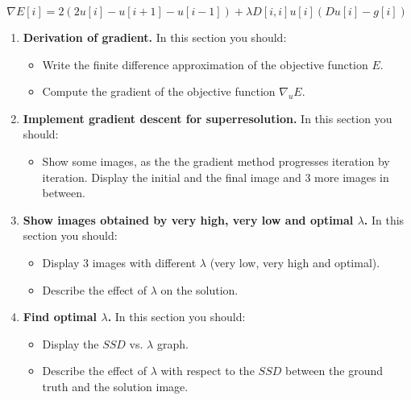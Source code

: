 \documentclass{paper}
\begin{document}
\begin{equation}
\nabla E[i] = 2 (2u[i] - u[i + 1] - u[i - 1]) + \lambda D[i,i] u[i] (Du[i] - g[i])
\end{equation}
\begin{enumerate}
\item \textbf{Derivation of gradient.} In this section you should:

\begin{itemize}
\item Write the finite difference approximation of the objective function $E$.
\item Compute the gradient of the objective function $\nabla_uE$.  
\end{itemize}


\item \textbf{Implement gradient descent for superresolution.} In this section you should:

\begin{itemize}
\item Show some images, as the the gradient method progresses iteration by iteration. Display the initial and the final image and 3 more images in between.
\end{itemize}

\item \textbf{Show images obtained by very high, very low and optimal $\lambda$.} In this section you should:

\begin{itemize}
\item Display 3 images with different $\lambda$ (very low, very high and optimal).
\item Describe the effect of $\lambda$ on the solution.
\end{itemize}

\item \textbf{ Find optimal $\lambda$.} In this section you should:

\begin{itemize}
\item Display the $SSD$ vs. $\lambda$ graph.
\item Describe the effect of $\lambda$ with respect to the $SSD$ between the ground truth and the solution image.
\end{itemize}


\end{enumerate}


 
\end{document}
